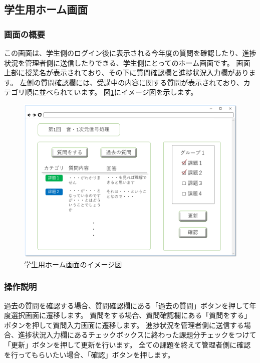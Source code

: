 \newpage

\subsection{学生用ホーム画面}
\subsubsection{画面の概要}
この画面は、学生側のログイン後に表示される今年度の質問を確認したり、進捗状況を管理者側に送信したりできる、学生側にとってのホーム画面です。
画面上部に授業名が表示されており、その下に質問確認欄と進捗状況入力欄があります。
左側の質問確認欄には、受講中の内容に関する質問が表示されており、カテゴリ順に並べられています。
図\ref{fig:sc_class_student}にイメージ図を示します。

\begin{figure}[htbp]
\begin{center}
  \includegraphics[width=1\linewidth,clip]{./img/sc_class_student.png}
  \caption{学生用ホーム画面のイメージ図}\label{fig:sc_class_student}
\end{center}
\end{figure}

\subsubsection{操作説明}
過去の質問を確認する場合、質問確認欄にある「過去の質問」ボタンを押して年度選択画面に遷移します。
質問をする場合、質問確認欄にある「質問をする」ボタンを押して質問入力画面に遷移します。
進捗状況を管理者側に送信する場合、進捗状況入力欄にあるチェックボックスに終わった課題分チェックをつけて「更新」ボタンを押して更新を行います。
全ての課題を終えて管理者側に確認を行ってもらいたい場合、「確認」ボタンを押します。

